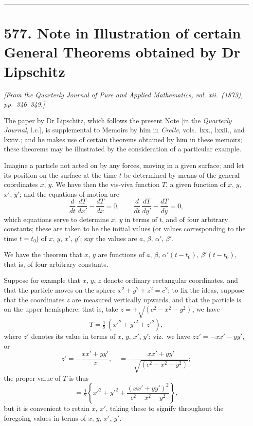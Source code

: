 \documentclass[11pt]{article}
\begin{document}
\bigskip
\hrule
\bigskip

\section*{577. Note in Illustration of certain General Theorems obtained by Dr Lipschitz}

\noindent\textit{[From the Quarterly Journal of Pure and Applied Mathematics, vol. xii.\ (1873), pp.\ 346--349.]}

\medskip

The paper by Dr Lipschitz, which follows the present Note [in the \textit{Quarterly Journal}, l.c.], is supplemental to Memoirs by him in \textit{Crelle}, vols.\ lxx., lxxii., and lxxiv.; and he makes use of certain theorems obtained by him in these memoirs; these theorems may be illustrated by the consideration of a particular example.

Imagine a particle not acted on by any forces, moving in a given surface; and let its position on the surface at the time $t$ be determined by means of the general coordinates $x$, $y$. We have then the vis-viva function $T$, a given function of $x$, $y$, $x'$, $y'$; and the equations of motion are
\[
\frac{d}{dt}\,\frac{dT}{dx'} - \frac{dT}{dx} = 0,\qquad \frac{d}{dt}\,\frac{dT}{dy'} - \frac{dT}{dy} = 0,
\]
which equations serve to determine $x$, $y$ in terms of $t$, and of four arbitrary constants; these are taken to be the initial values (or values corresponding to the time $t = t_{0}$) of $x$, $y$, $x'$, $y'$; say the values are $a$, $\beta$, $\alpha'$, $\beta'$.

We have the theorem that $x$, $y$ are functions of $a$, $\beta$, $\alpha'(t - t_{0})$, $\beta'(t - t_{0})$, that is, of four arbitrary constants.

Suppose for example that $x$, $y$, $z$ denote ordinary rectangular coordinates, and that the particle moves on the sphere $x^{2} + y^{2} + z^{2} = c^{2}$; to fix the ideas, suppose that the coordinates $z$ are measured vertically upwards, and that the particle is on the upper hemisphere; that is, take $z = +\sqrt{(c^{2} - x^{2} - y^{2})}$, we have
\[
T = \tfrac{1}{2}\,(x'^{2} + y'^{2} + z'^{2}),
\]
where $z'$ denotes its value in terms of $x$, $y$, $x'$, $y'$; viz.\ we have $zz' = -xx' - yy'$, or
\[
z' = -\frac{xx' + yy'}{z},\quad = -\frac{xx' + yy'}{\sqrt{(c^{2} - x^{2} - y^{2})}};
\]
the proper value of $T$ is thus
\[
= \tfrac{1}{2}\!\left\{x'^{2} + y'^{2} + \frac{(xx' + yy')^{2}}{c^{2} - x^{2} - y^{2}}\right\},
\]
but it is convenient to retain $x$, $x'$, taking these to signify throughout the foregoing values in terms of $x$, $y$, $x'$, $y'$.
\end{document}
